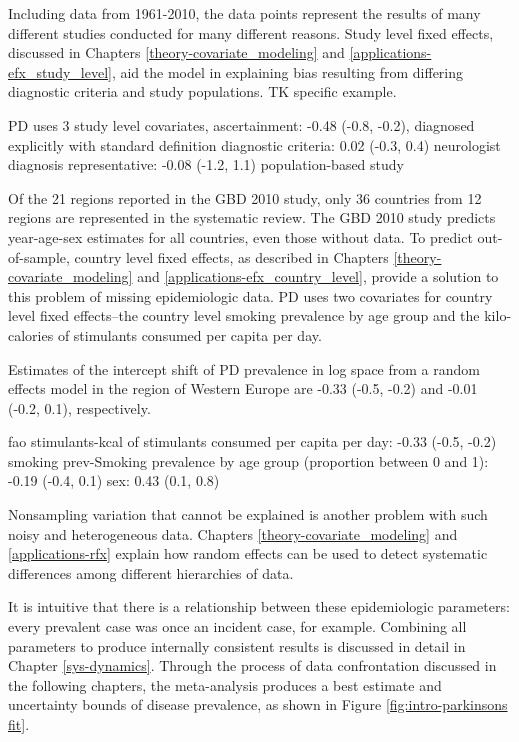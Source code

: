 Including data from 1961-2010, the data points represent the results of many different studies conducted for many different reasons.  Study level fixed effects, discussed in Chapters \ref{theory-covariate_modeling} and \ref{applications-efx_study_level}, aid the model in explaining bias resulting from differing diagnostic criteria and study populations. TK specific example.

PD uses 3 study level covariates,
ascertainment: -0.48 (-0.8, -0.2), diagnosed explicitly with standard definition diagnostic criteria: 0.02 (-0.3, 0.4) neurologist diagnosis 
representative: -0.08 (-1.2, 1.1) population-based study

Of the 21 regions reported in the GBD 2010 study, only 36 countries from 12 regions are represented in the systematic review.  The GBD 2010 study predicts year-age-sex estimates for all countries, even those without data.  To predict out-of-sample, country level fixed effects, as described in Chapters \ref{theory-covariate_modeling} and \ref{applications-efx_country_level}, provide a solution to this problem of missing epidemiologic data.  PD uses two covariates for country level fixed effects--the country level smoking prevalence by age group and the kilo-calories of stimulants consumed per capita per day.

Estimates of the intercept shift of PD prevalence in log space from a random effects model in the region of Western Europe are -0.33 (-0.5, -0.2) and -0.01 (-0.2, 0.1), respectively.

fao stimulants-kcal of stimulants consumed per capita per day: -0.33 (-0.5, -0.2)
smoking prev-Smoking prevalence by age group (proportion between 0 and 1): -0.19 (-0.4, 0.1)
sex:  0.43 (0.1, 0.8)

Nonsampling variation that cannot be explained is another problem with such noisy and heterogeneous data.  Chapters \ref{theory-covariate_modeling} and \ref{applications-rfx} explain how random effects can be used to detect systematic differences among different hierarchies of data.

It is intuitive that there is a relationship between these epidemiologic parameters: every prevalent case was once an incident case, for example.  Combining all parameters to produce internally consistent results is discussed in detail in Chapter \ref{sys-dynamics}.  Through the process of data confrontation discussed in the following chapters, the meta-analysis produces a best estimate and uncertainty bounds of disease prevalence, as shown in Figure \ref{fig:intro-parkinsons fit}.

